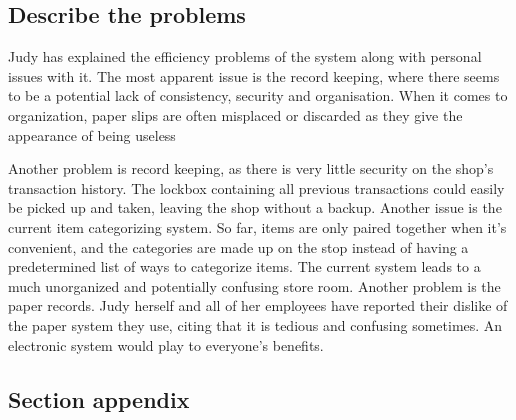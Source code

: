 \subsection{Describe the problems}
Judy has explained the efficiency problems of the system along with personal issues with it. The most apparent issue is the record keeping, where there seems to be a potential lack of consistency, security and organisation. When it comes to organization, paper slips are often misplaced or discarded as they give the appearance of being useless

Another problem is record keeping, as there is very little security on the shop's transaction history. The lockbox containing all previous transactions could easily be picked up and taken, leaving the shop without a backup. Another issue is the current item categorizing system. So far, items are only paired together when it's convenient, and the categories are made up on the stop instead of having a predetermined list of ways to categorize items. The current system leads to a much unorganized and potentially confusing store room. Another problem is the paper records. Judy herself and all of her employees have reported their dislike of the paper system they use, citing that it is tedious and confusing sometimes. An electronic system would play to everyone's benefits.
\subsection{Section appendix}

